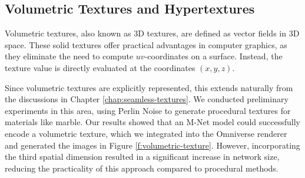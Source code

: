 \subsection{Volumetric Textures and Hypertextures}
\label{sec:3Dtextures}

Volumetric textures, also known as 3D textures, are defined as vector fields in 3D space. These solid textures offer practical advantages in computer graphics, as they eliminate the need to compute $uv$-coordinates on a surface. Instead, the texture value is directly evaluated at the coordinates $(x, y, z)$.


Since volumetric textures are explicitly represented, this extends naturally from the discussions in Chapter \ref{chap:seamless-textures}. We conducted preliminary experiments in this area, using Perlin Noise to generate procedural textures for materials like marble. Our results showed that an M-Net model could successfully encode a volumetric texture, which we integrated into the Omniverse renderer and generated the images in Figure \ref{f:volumetric-texture}. However, incorporating the third spatial dimension resulted in a significant increase in network size, reducing the practicality of this approach compared to procedural methods.

